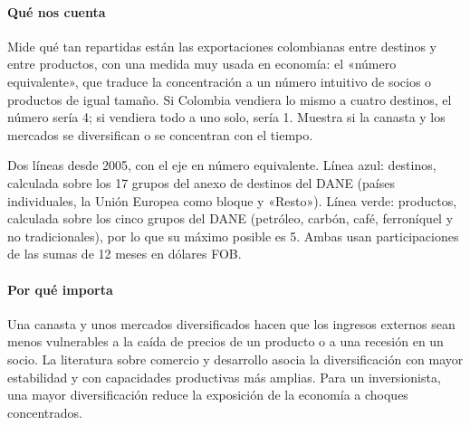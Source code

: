 \paragraph{Qué nos cuenta}
Mide qué tan repartidas están las exportaciones colombianas entre destinos y entre productos, con una medida muy usada en economía: el «número equivalente», que traduce la concentración a un número intuitivo de socios o productos de igual tamaño. Si Colombia vendiera lo mismo a cuatro destinos, el número sería 4; si vendiera todo a uno solo, sería 1. Muestra si la canasta y los mercados se diversifican o se concentran con el tiempo.

\begin{leer}
Dos líneas desde 2005, con el eje en número equivalente. Línea azul: destinos, calculada sobre los 17 grupos del anexo de destinos del DANE (países individuales, la Unión Europea como bloque y «Resto»). Línea verde: productos, calculada sobre los cinco grupos del DANE (petróleo, carbón, café, ferroníquel y no tradicionales), por lo que su máximo posible es 5. Ambas usan participaciones de las sumas de 12 meses en dólares FOB.
\end{leer}

\paragraph{Por qué importa}
Una canasta y unos mercados diversificados hacen que los ingresos externos sean menos vulnerables a la caída de precios de un producto o a una recesión en un socio. La literatura sobre comercio y desarrollo asocia la diversificación con mayor estabilidad y con capacidades productivas más amplias. Para un inversionista, una mayor diversificación reduce la exposición de la economía a choques concentrados.

